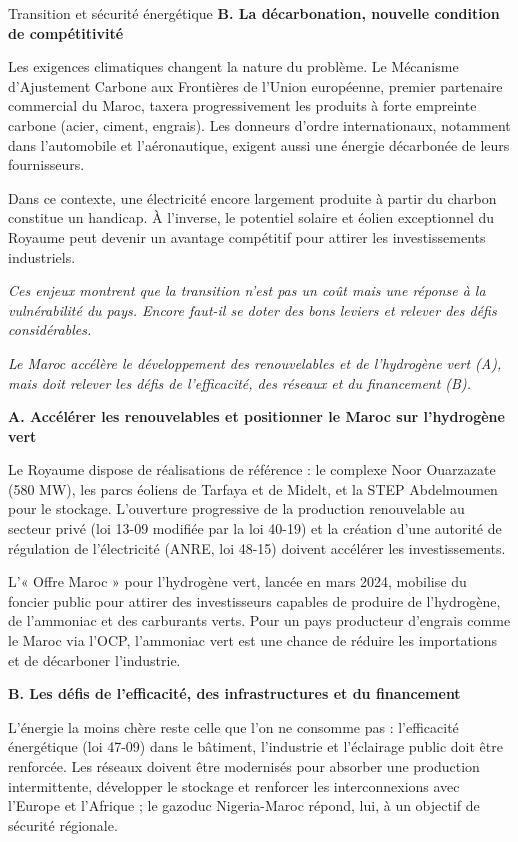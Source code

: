 \begin{copiemodele}{Transition et sécurité énergétique}
\textbf{B. La décarbonation, nouvelle condition de compétitivité}

Les exigences climatiques changent la nature du problème. Le Mécanisme d'Ajustement Carbone aux Frontières de l'Union européenne, premier partenaire commercial du Maroc, taxera progressivement les produits à forte empreinte carbone (acier, ciment, engrais). Les donneurs d'ordre internationaux, notamment dans l'automobile et l'aéronautique, exigent aussi une énergie décarbonée de leurs fournisseurs.

Dans ce contexte, une électricité encore largement produite à partir du charbon constitue un handicap. À l'inverse, le potentiel solaire et éolien exceptionnel du Royaume peut devenir un avantage compétitif pour attirer les investissements industriels.

\textit{Ces enjeux montrent que la transition n'est pas un coût mais une réponse à la vulnérabilité du pays. Encore faut-il se doter des bons leviers et relever des défis considérables.}

\textit{Le Maroc accélère le développement des renouvelables et de l'hydrogène vert (A), mais doit relever les défis de l'efficacité, des réseaux et du financement (B).}

\textbf{A. Accélérer les renouvelables et positionner le Maroc sur l'hydrogène vert}

Le Royaume dispose de réalisations de référence : le complexe Noor Ouarzazate (580 MW), les parcs éoliens de Tarfaya et de Midelt, et la STEP Abdelmoumen pour le stockage. L'ouverture progressive de la production renouvelable au secteur privé (loi 13-09 modifiée par la loi 40-19) et la création d'une autorité de régulation de l'électricité (ANRE, loi 48-15) doivent accélérer les investissements.

L'« Offre Maroc » pour l'hydrogène vert, lancée en mars 2024, mobilise du foncier public pour attirer des investisseurs capables de produire de l'hydrogène, de l'ammoniac et des carburants verts. Pour un pays producteur d'engrais comme le Maroc via l'OCP, l'ammoniac vert est une chance de réduire les importations et de décarboner l'industrie.

\textbf{B. Les défis de l'efficacité, des infrastructures et du financement}

L'énergie la moins chère reste celle que l'on ne consomme pas : l'efficacité énergétique (loi 47-09) dans le bâtiment, l'industrie et l'éclairage public doit être renforcée. Les réseaux doivent être modernisés pour absorber une production intermittente, développer le stockage et renforcer les interconnexions avec l'Europe et l'Afrique ; le gazoduc Nigeria-Maroc répond, lui, à un objectif de sécurité régionale.


\end{copiemodele}
